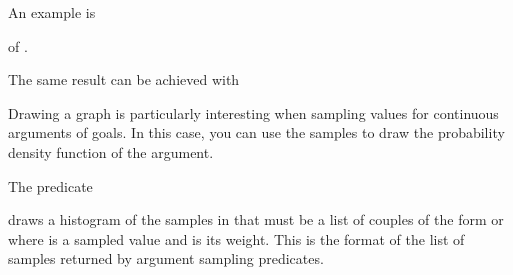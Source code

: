 \documentclass[letterpaper,10pt,english]{sphinxmanual}
\begin{document}
\sphinxAtStartPar
An example is

\begin{sphinxVerbatim}[commandchars=\\\{\}]
 \PYG{p}{[}\PYG{p}{]}
\end{sphinxVerbatim}

\sphinxAtStartPar
of .

\sphinxAtStartPar
The same result can be achieved with

\begin{sphinxVerbatim}[commandchars=\\\{\}]
 
\end{sphinxVerbatim}

\sphinxAtStartPar
Drawing a graph is particularly interesting when sampling values for continuous arguments of goals.
In this case, you can use the samples to draw the probability density function of the argument.

\sphinxAtStartPar
The predicate

\begin{sphinxVerbatim}[commandchars=\\\{\}]
  
\end{sphinxVerbatim}

\sphinxAtStartPar
draws a histogram of the samples in  that must be a list of couples of the form  or  where  is a sampled value and  is its weight.
This is the format of the list of samples returned by argument sampling predicates.
\end{document}
